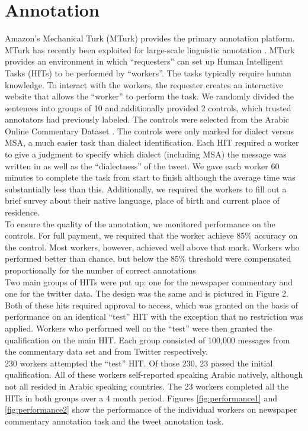 \documentclass[10pt, a4paper]{article}
\begin{document}
\section{Annotation}\label{sec:annotation}
Amazon's Mechanical Turk (MTurk) provides the primary annotation
platform. MTurk has recently been exploited for large-scale linguistic
annotation \cite{callison2010creating,zaidan2011crowdsourcing}. MTurk
provides an environment in which ``requesters'' can set up Human
Intelligent Tasks (HITs) to be performed by ``workers''. The tasks
typically require human knowledge. To interact with the workers, the
requester creates an interactive website that allows the
``worker'' to perform the task. We randomly divided the sentences into
groups of 10 and additionally provided 2 controls, which trusted
annotators had previously labeled. The controls were selected from the
Arabic Online Commentary Dataset \cite{zaidan2011arabic}.  The controls
were only marked for dialect versus MSA, a much easier task than
dialect identification.  Each HIT required a worker to give a judgment
to specify which dialect (including MSA) the message was written in as
well as the ``dialectness'' of the tweet.  We gave each worker 60
minutes to complete the task from start to finish although the average
time was substantially less than this. Additionally, we required the
workers to fill out a brief survey about their native language, place
of birth and current place of residence.
\\
To ensure the quality of the annotation, we monitored performance on
the controls. For full payment, we required that the worker achieve
85\% accuracy on the control. Most workers, however, achieved well
above that mark. Workers who performed better than chance, but below
the 85\% threshold were compensated proportionally for the number of
correct annotations
\\
Two main groups of HITs were put up: one for the newspaper commentary
and one for the twitter data. The design was the same and is pictured
in Figure 2. Both of these hits required approval to access, which
was granted on the basis of performance on an
identical ``test'' HIT with the exception that no restriction was
applied. Workers who performed well on the ``test'' were then granted
the qualification on the main HIT. Each group consisted of 100,000
messages from the commentary data set and from Twitter respectively.
\\
230 workers attempted the ``test'' HIT. Of those 230, 23 passed the
initial qualification. All of these workers self-reported speaking
Arabic natively, although not all resided in Arabic speaking countries. 
The 23 workers completed all the HITs in both groups over a 4
month period. Figures \ref{fig:performance1} and \ref{fig:performance2} 
show the performance of the individual workers on newspaper commentary
annotation task and the tweet annotation task.
\end{document}
